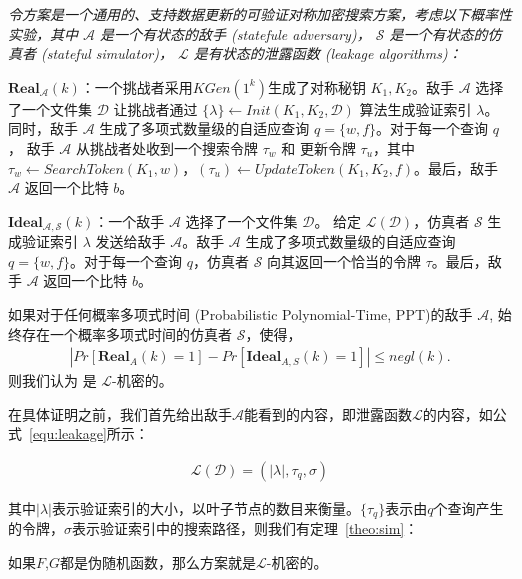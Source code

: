 \begin{definition}\label{def:sim}
  {\itshape
      令方案\single 是一个通用的、支持数据更新的可验证对称加密搜索方案，考虑以下概率性实验，其中 $\mathcal{A}$ 是一个有状态的敌手 (statefule adversary)， $\mathcal{S}$ 是一个有状态的仿真者 (stateful simulator)， $\mathcal{L}$ 是有状态的泄露函数 (leakage algorithms)：

      $\mathbf{Real}_\mathcal{A}(k)$：一个挑战者采用$KGen(1^k)$生成了对称秘钥 $K_1,K_2$。敌手 $\mathcal{A}$ 选择了一个文件集 $\mathcal{D}$ 让挑战者通过 $\{\lambda\} \leftarrow Init(K_1,K_2,\mathcal{D})$ 算法生成验证索引 $\lambda$。同时，敌手 $\mathcal{A}$ 生成了多项式数量级的自适应查询 $q = \{w,f\}$。对于每一个查询 $q$， 敌手 $\mathcal{A}$ 从挑战者处收到一个搜索令牌 $\tau_w$ 和 更新令牌 $\tau_u$，其中 $\tau_w \leftarrow SearchToken(K_1,w)$，$(\tau_u) \leftarrow UpdateToken(K_1,K_2,f)$。最后，敌手 $\mathcal{A}$ 返回一个比特 $b$。

      $\mathbf{Ideal}_\mathcal{A,S}(k)$：一个敌手 $\mathcal{A}$ 选择了一个文件集 $\mathcal{D}$。 给定 $\mathcal{L}(\mathcal{D})$，仿真者 $\mathcal{S}$ 生成验证索引 $\lambda$ 发送给敌手 $\mathcal{A}$。敌手 $\mathcal{A}$ 生成了多项式数量级的自适应查询 $q = \{w,f\}$。对于每一个查询 $q$，仿真者 $\mathcal{S}$ 向其返回一个恰当的令牌 $\tau$。最后，敌手 $\mathcal{A}$ 返回一个比特 $b$。

      如果对于任何概率多项式时间 (Probabilistic Polynomial-Time, PPT)的敌手 $\mathcal{A}$, 始终存在一个概率多项式时间的仿真者 $\mathcal{S}$，使得，
      \begin{align}
        \label{equ:sim}
        |Pr[\mathbf{Real}_A(k) = 1] - Pr[\mathbf{Ideal}_{A,S}(k) = 1]| \leq negl(k).
      \end{align}
      则我们认为 \single 是 $\mathcal{L}$-机密的。
  }
\end{definition}


在具体证明之前，我们首先给出敌手$\mathcal{A}$能看到的内容，即泄露函数$\mathcal{L}$的内容，如公式~\ref{equ:leakage}所示：

\begin{align}\label{equ:leakage}
  \mathcal{L}(\mathcal{D})=(|\lambda|,{\tau}_q,{\sigma})
\end{align}

其中$|\lambda|$表示验证索引的大小，以叶子节点的数目来衡量。$\{\tau_q\}$表示由$q$个查询产生的令牌，$\sigma$表示验证索引中的搜索路径，则我们有定理~\ref{theo:sim}：

\begin{theorem}\label{theo:sim}
    如果$F$,$G$都是伪随机函数，那么方案\single 就是$\mathcal{L}$-机密的。
\end{theorem}

